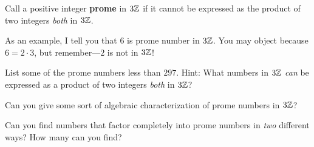 \begin{definition}
Call a positive integer \textbf{prome} in $3\mathbb Z$ if it cannot be
expressed as the product of two integers \textit{both} in $3\mathbb Z$.
\end{definition}

As an example, I tell you that $6$ is prome number in $3\mathbb Z$. You may
object because $6 = 2\cdot 3$, but remember---$2$ is not in $3\mathbb Z$!


\begin{prob}
List some of the prome numbers less than $297$.  Hint:  What numbers in $3\mathbb Z$ \emph{can} be expressed as a product of two integers \emph{both} in $3\mathbb Z$?  
\end{prob}

\begin{prob}
Can you give some sort of algebraic characterization of prome numbers
in $3\mathbb Z$? 
\end{prob}

\begin{prob}
Can you find numbers that factor completely into prome numbers in
\textit{two} different ways? How many can you find?
\end{prob}





